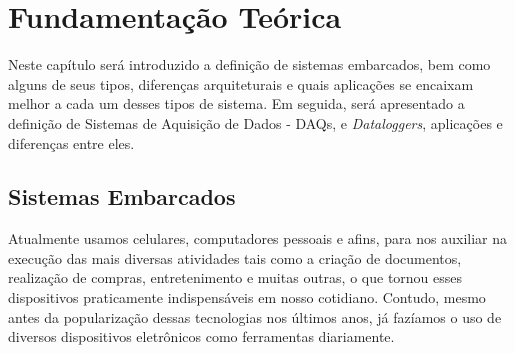 \chapter{Fundamentação Teórica}
\label{cap:fundamentacao-teorica}



Neste capítulo será introduzido a definição de sistemas embarcados, bem como alguns de seus tipos, diferenças arquiteturais e quais aplicações se encaixam melhor a cada um desses tipos de sistema. Em seguida, será apresentado a definição de Sistemas de Aquisição de Dados - DAQs, e \textit{Dataloggers}, aplicações e diferenças entre eles.





\section{Sistemas Embarcados}\label{sec:definicao_sistemas_embarcados}


Atualmente usamos celulares, computadores pessoais e afins, para nos auxiliar na execução das mais diversas atividades tais como a criação de documentos, realização de compras, entretenimento e muitas outras, o que tornou esses dispositivos praticamente indispensáveis em nosso cotidiano. Contudo, mesmo antes da popularização dessas tecnologias nos últimos anos, já fazíamos o uso de diversos dispositivos eletrônicos como ferramentas diariamente.

